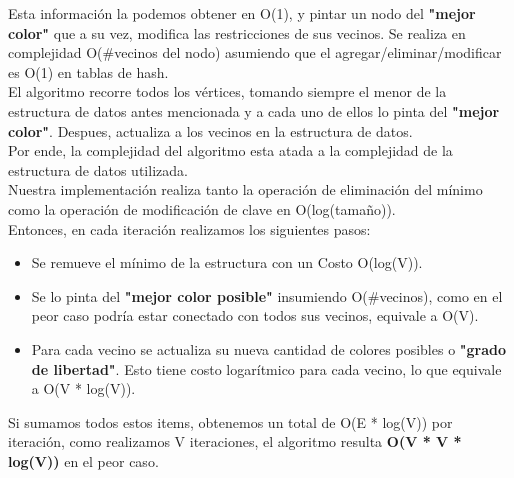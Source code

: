 

Esta información la podemos obtener en O(1), y pintar un nodo del \textbf{"mejor color"} que a su vez, modifica las restricciones de sus vecinos. Se realiza en complejidad O($\#$vecinos del nodo) asumiendo que el agregar/eliminar/modificar es O(1) en tablas de hash.\\

	 El algoritmo recorre todos los vértices, tomando siempre el menor de la estructura de datos antes mencionada y a cada uno de ellos lo pinta del \textbf{"mejor color"}. Despues, actualiza a los vecinos en la estructura de datos.\\
	 Por ende, la complejidad del algoritmo esta atada a la complejidad de la estructura de datos utilizada.\\

	 Nuestra implementación realiza tanto la operación de eliminación del mínimo como la operación de modificación de clave en O(log(tamaño)).\\
	 Entonces, en cada iteración realizamos los siguientes pasos:
	 \begin{itemize}
		\item Se remueve el mínimo de la estructura con un Costo O(log(V)).
		\item Se lo pinta del \textbf{"mejor color posible"} insumiendo O($\#$vecinos), como en el peor caso podría estar conectado con todos sus vecinos, equivale a O(V).
		\item Para cada vecino se actualiza su nueva cantidad de colores posibles o \textbf{"grado de libertad"}. Esto tiene costo logarítmico para cada vecino, lo que equivale a O(V * log(V)).
	 \end{itemize}

	  Si sumamos todos estos items, obtenemos un total de O(E * log(V)) por iteración, como realizamos V iteraciones, el algoritmo resulta \textbf{O(V * V * log(V))} en el peor caso.\\